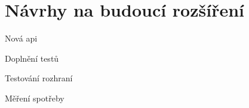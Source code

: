 \chapter{Návrhy na budoucí rozšíření}

Nová api

Doplnění testů

Testování rozhraní

Měření spotřeby


\endinput
